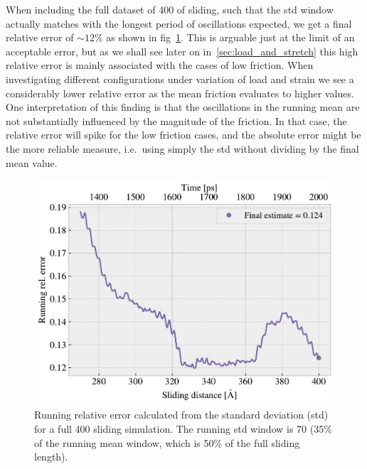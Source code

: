 When including the full dataset of \SI{400}{} of sliding, such that the \acrshort{std} window actually matches with the longest period of oscillations expected, we get a final relative error of $\sim 12 \%$ as shown in fig~\cref{fig:runstd_long}. This is arguable just at the limit of an acceptable error, but as we shall see later on in~\cref{sec:load_and_stretch} this high relative error is mainly associated with the cases of low friction. When investigating different configurations under variation of load and strain we see a considerably lower relative error as the mean friction evaluates to higher values. One interpretation of this finding is that the oscillations in the running mean are not substantially influenced by the magnitude of the friction. In that case, the relative error will spike for the low friction cases, and the absolute error might be the more reliable measure, i.e.\ using simply the \acrshort{std} without dividing by the final mean value.


\begin{figure}[!htb]
  \centering
  \includegraphics[width=0.5\linewidth]{figures/baseline/Ff_runstd_long.pdf}
  \caption{Running relative error calculated from the standard deviation (std) for a full \SI{400}{{}} sliding simulation. The running std window is \SI{70}{} (35\% of the running mean window, which is 50\% of the full sliding length).}
  \label{fig:runstd_long}
\end{figure}


